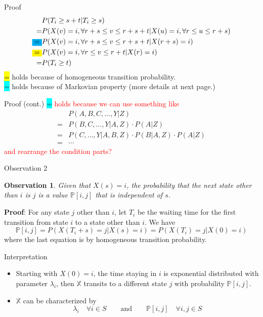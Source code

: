 \documentclass[mathserif]{beamer}
\newtheorem{obs}{Observation}
\begin{document}
\begin{frame}{Proof}
\begin{align*}
& P(T_i\geq s+t | T_i\geq s) \\
= & P(X(v)=i, \forall r+s\leq v\leq r+s+t | X(u)=i, \forall r\leq u\leq r+s) \\
\colorbox{cyan}{=} & P(X(v)=i, \forall r+s\leq v\leq r+s+t | X(r+s)=i) \\
\colorbox{yellow}{=} & P(X(v)=i, \forall r\leq v\leq r+t | X(r)=i) \\
= & P(T_i\geq t)
\end{align*}
\colorbox{yellow}{=} holds because of homogeneous transition probability. \\
\colorbox{cyan}{=} holds because of Markovian property (more details at next page.)
\end{frame}

\begin{frame}{Proof (cont.)}
\colorbox{cyan}{=} \textcolor{red}{holds because we can use something like}
\begin{align*}
& P(A, B, C, \ldots, Y | Z) \\
= & P(B, C, \ldots, Y | A, Z)\cdot P(A | Z) \\
= & P(C, \ldots, Y | A, B, Z)\cdot P(B | A, Z)\cdot P(A | Z) \\
= & \cdots
\end{align*}
\textcolor{red}{and rearrange the condition parts?}
\end{frame}

\begin{frame}{Observation 2}
\begin{obs}
Given that $X(s)=i$, the probability that the next state other than $i$ is $j$ is a value $\mathbb{P}[i,j]$ that is independent of $s$.
\end{obs}
\textbf{Proof}: For any state $j$ other than $i$, let $T_i$ be the waiting time for the first transition from state $i$ to a state other than $i$.
We have
\[
\mathbb{P}[i,j] = P(X(T_i + s) = j | X(s) = i) = P(X(T_i) = j | X(0) = i)
\]
where the last equation is by homogeneous transition probability.
\end{frame}

\begin{frame}{Interpretation}
\begin{itemize}
\item Starting with $X(0) = i$, the time staying in $i$ is exponential distributed with parameter $\lambda_i$, then $\mathbb{X}$ transits to a different state $j$ with probability $\mathbb{P}[i,j]$.
\item $\mathbb{X}$ can be characterized by
\[
\lambda_i\quad\forall i\in S \qquad\text{and}\qquad \mathbb{P}[i,j]\quad\forall i,j \in S
\]
\end{itemize}
\end{frame}
\end{document}
